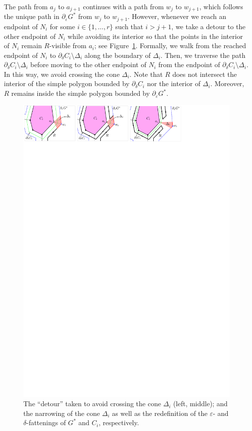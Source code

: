 \documentclass{patmorin}
\begin{document}
The path from $a_j$ to $a_{j+1}$ continues with a path from $w_j$ to $w_{j+1}$, which follows the unique path in $\partial_\varepsilon G^*$ from $w_j$ to $w_{j+1}$. However, whenever we reach an endpoint of $N_i$ for some $i\in \{1,\dots,r\}$ such that $i>j+1$, we take a detour to the other endpoint of $N_i$ while avoiding its interior so that the points in the interior of $N_i$ remain $R$-visible from $a_i$; see Figure~\ref{fig:Skip Component}. Formally, we walk from the reached endpoint of $N_i$ to $\partial_\delta C_i\setminus \Delta_i$ along the boundary of $\Delta_i$. Then, we traverse the path $\partial_\delta C_i\setminus \Delta_i$ before moving to the other endpoint of $N_i$ from the endpoint of $\partial_\delta C_i \setminus \Delta_i$. In this way, we avoid crossing the cone $\Delta_i$. Note that $R$ does not intersect the interior of the simple polygon bounded by $\partial_\delta C_i$ nor the interior of $\Delta_i$. Moreover, $R$ remains inside the simple polygon bounded by $\partial_\varepsilon G^*$.

\begin{figure}[b]
\centering
\includegraphics{img/SkipComponent.pdf}
\caption{\small The ``detour'' taken to avoid crossing the cone $\Delta_i$ (left, middle); and the narrowing of the cone $\Delta_i$ as well as the redefinition of the $\varepsilon$- and $\delta$-fattenings of $G^*$ and $C_i$, respectively.}
\label{fig:Skip Component}
\end{figure}
\end{document}
